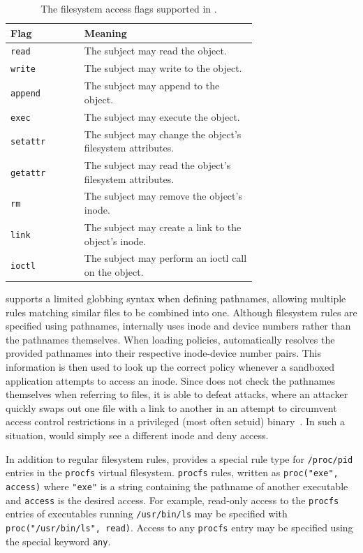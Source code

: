 \begin{table}[htpb]
    \centering
    \caption{The filesystem access flags supported in \bpfbox{}.}
    \label{tab:fs-access}
    \begin{tabular}{lp{0.7\linewidth}}
    \toprule
    Flag & Meaning \\
    \midrule
    \texttt{read}    & The subject may read the object. \\
    \texttt{write}   & The subject may write to the object. \\
    \texttt{append}  & The subject may append to the object. \\
    \texttt{exec}    & The subject may execute the object. \\
    \texttt{setattr} & The subject may change the object's filesystem attributes. \\
    \texttt{getattr} & The subject may read the object's filesystem attributes. \\
    \texttt{rm}      & The subject may remove the object's inode. \\
    \texttt{link}    & The subject may create a link to the object's inode. \\
    \texttt{ioctl}   & The subject may perform an ioctl call on the object. \\
    \bottomrule
    \end{tabular}
\end{table}

\bpfbox{} supports a limited globbing syntax when defining pathnames, allowing multiple
rules matching similar files to be combined into one.  Although filesystem rules are
specified using pathnames, \bpfbox{} internally uses inode and device numbers rather than
the pathnames themselves. When loading policies, \bpfbox{} automatically resolves the
provided pathnames into their respective inode-device number pairs. This information is
then used to look up the correct policy whenever a sandboxed application attempts to
access an inode.  Since \bpfbox{} does not check the pathnames themselves when referring
to files, it is able to defeat  attacks, where an
attacker quickly swaps out one file with a link to another in an attempt to circumvent
access control restrictions in a privileged (most often setuid)
binary~\cite{bishop1996_checking}.  In such a situation, \bpfbox{} would simply see
a different inode and deny access.

In addition to regular filesystem rules, \bpfbox{} provides a special rule type for
\texttt{/proc/pid} entries in the \texttt{procfs} virtual filesystem. \texttt{procfs}
rules, written as \lstinline[language=bpfbox]{proc("exe", access)} where
\lstinline[language=bpfbox]{"exe"} is a string containing the pathname of another
executable and \lstinline[language=bpfbox]{access} is the desired access. For example,
read-only access to the \texttt{procfs} entries of executables running
\texttt{/usr/bin/ls} may be specified with \lstinline[language=bpfbox]{proc("/usr/bin/ls", read)}.
Access to any \texttt{procfs} entry may be specified using the special keyword
\lstinline[language=bpfbox]{any}.



